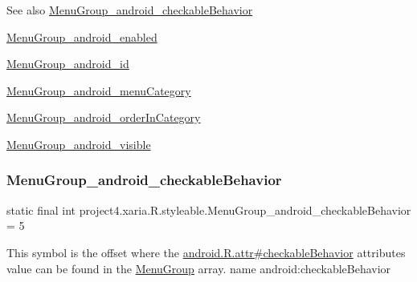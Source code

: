 \begin{DoxySeeAlso}{See also}
\hyperlink{classproject4_1_1xaria_1_1R_1_1styleable_a42649ced9274b4efe7927b3f3b772144}{Menu\+Group\+\_\+android\+\_\+checkable\+Behavior} 

\hyperlink{classproject4_1_1xaria_1_1R_1_1styleable_aab11de43b52f47075f886635de3205c7}{Menu\+Group\+\_\+android\+\_\+enabled} 

\hyperlink{classproject4_1_1xaria_1_1R_1_1styleable_a640dfef25dc9726381405f90ea7a87a2}{Menu\+Group\+\_\+android\+\_\+id} 

\hyperlink{classproject4_1_1xaria_1_1R_1_1styleable_aead14cbe860986024e8f6cbd4d09655a}{Menu\+Group\+\_\+android\+\_\+menu\+Category} 

\hyperlink{classproject4_1_1xaria_1_1R_1_1styleable_a7352099be18dea8bbb19d98372d2b1ee}{Menu\+Group\+\_\+android\+\_\+order\+In\+Category} 

\hyperlink{classproject4_1_1xaria_1_1R_1_1styleable_a8c41524dbd054ca8362714efbaa75719}{Menu\+Group\+\_\+android\+\_\+visible} 
\end{DoxySeeAlso}
\mbox{\label{classproject4_1_1xaria_1_1R_1_1styleable_a42649ced9274b4efe7927b3f3b772144}} 
\subsubsection{\texorpdfstring{Menu\+Group\+\_\+android\+\_\+checkable\+Behavior}{MenuGroup\_android\_checkableBehavior}}
{\footnotesize\ttfamily static final int project4.\+xaria.\+R.\+styleable.\+Menu\+Group\+\_\+android\+\_\+checkable\+Behavior = 5\hspace{0.3cm}{\ttfamily [static]}}

This symbol is the offset where the \hyperlink{}{android.\+R.\+attr\#checkable\+Behavior} attribute\textquotesingle{}s value can be found in the \hyperlink{classproject4_1_1xaria_1_1R_1_1styleable_ae48043cd359a2d376fa65b4af13eca9a}{Menu\+Group} array.  name android\+:checkable\+Behavior \mbox{\label{classproject4_1_1xaria_1_1R_1_1styleable_aab11de43b52f47075f886635de3205c7}} 
